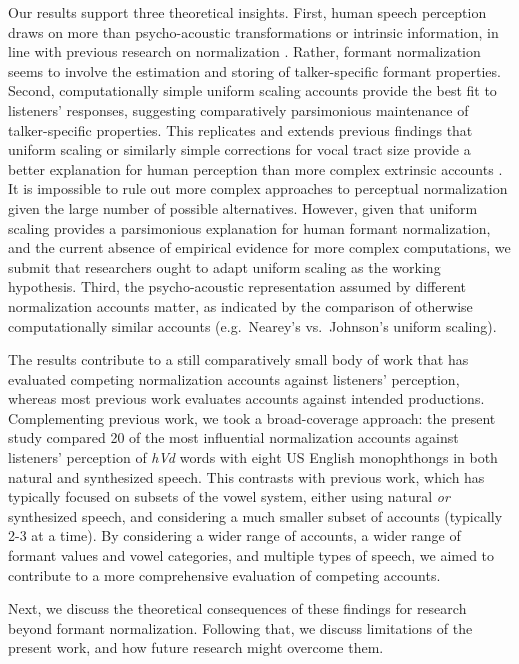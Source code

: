 \documentclass[preprint]{JASA}
\begin{document}
Our results support three theoretical insights. First, human speech perception draws on more than psycho-acoustic transformations or intrinsic information, in line with previous research on normalization \citep{nearey1989, ladefoged-broadbent1957, adank2004}. Rather, formant normalization seems to involve the estimation and storing of talker-specific formant properties. Second, computationally simple uniform scaling accounts provide the best fit to listeners' responses, suggesting comparatively parsimonious maintenance of talker-specific properties. This replicates and extends previous findings that uniform scaling or similarly simple corrections for vocal tract size provide a better explanation for human perception than more complex extrinsic accounts \citep{barreda2021, richter2017}. It is impossible to rule out more complex approaches to perceptual normalization given the large number of possible alternatives. However, given that uniform scaling provides a parsimonious explanation for human formant normalization, and the current absence of empirical evidence for more complex computations, we submit that researchers ought to adapt uniform scaling as the working hypothesis. Third, the psycho-acoustic representation assumed by different normalization accounts matter, as indicated by the comparison of otherwise computationally similar accounts (e.g.~Nearey's vs.~Johnson's uniform scaling).

The results contribute to a still comparatively small body of work that has evaluated competing normalization accounts against listeners' perception, whereas most previous work evaluates accounts against intended productions. Complementing previous work, we took a broad-coverage approach: the present study compared 20 of the most influential normalization accounts against listeners' perception of \emph{hVd} words with eight US English monophthongs in both natural and synthesized speech. This contrasts with previous work, which has typically focused on subsets of the vowel system, either using natural \emph{or} synthesized speech, and considering a much smaller subset of accounts (typically 2-3 at a time). By considering a wider range of accounts, a wider range of formant values and vowel categories, and multiple types of speech, we aimed to contribute to a more comprehensive evaluation of competing accounts.

Next, we discuss the theoretical consequences of these findings for research beyond formant normalization. Following that, we discuss limitations of the present work, and how future research might overcome them.
\end{document}

